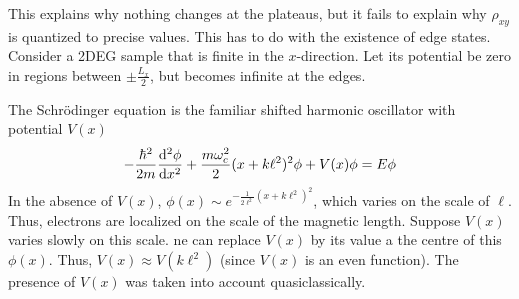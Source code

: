 \documentclass[12pt,a4paper,titlepage]{article}
\begin{document}
This explains why nothing changes at the plateaus, but it fails to explain why $\rho_{xy}$ is quantized to precise values. This has to do with the existence of edge states. Consider a 2DEG sample that is finite in the $x$-direction. Let its potential be zero in regions between $\pm \frac{L_{x}}{2}$, but becomes infinite at the edges.
\begin{center}
\end{center}
The Schr\"{o}dinger equation is the familiar shifted harmonic oscillator with potential $V(x)$
\begin{equation}
-\frac{\hbar^{2}}{2m}\dv[2]{\phi}{x}+\frac{m\omega_{c}^{2}}{2}(x+k\ell^{2})^{2}\phi+V(x)\phi=E\phi
\end{equation}
In the absence of $V(x)$, $\phi(x)\sim e^{-\frac{1}{2\ell^{2}}(x+k\ell^{2})^{2}}$, which varies on the scale of $\ell$. Thus, electrons are localized on the scale of the magnetic length. Suppose $V(x)$ varies slowly on this scale. ne can replace $V(x)$ by its value a the centre of this $\phi(x)$. Thus, $V(x)\approx V(k\ell^{2})$ (since $V(x)$ is an even function). The presence of $V(x)$ was taken into account quasiclassically.\\
\end{document}

